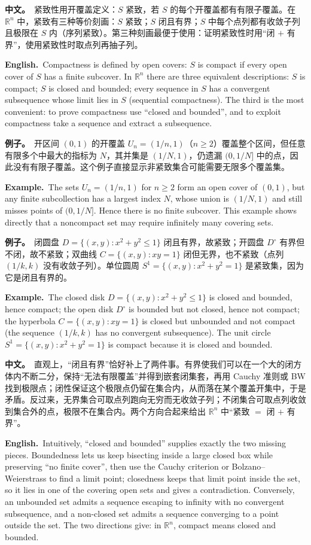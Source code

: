 \documentclass[UTF8,11pt,a4paper]{ctexart}
\newcommand{\BOTH}[2]{\par\noindent\textbf{中文。}\ #1\par\noindent\textbf{English.}\ #2\par}
\newcommand{\EX}[2]{\par\noindent\textbf{例子。}\ #1\par\noindent\textbf{Example.}\ #2\par}
\begin{document}
\BOTH{紧致性用开覆盖定义：$S$ 紧致，若 $S$ 的每个开覆盖都有有限子覆盖。在 $\mathbb R^n$ 中，紧致有三种等价刻画：$S$ 紧致；$S$ 闭且有界；$S$ 中每个点列都有收敛子列且极限在 $S$ 内（序列紧致）。第三种刻画最便于使用：证明紧致性时用“闭 $+$ 有界”，使用紧致性时取点列再抽子列。}{Compactness is defined by open covers: $S$ is compact if every open cover of $S$ has a finite subcover. In $\mathbb R^n$ there are three equivalent descriptions: $S$ is compact; $S$ is closed and bounded; every sequence in $S$ has a convergent subsequence whose limit lies in $S$ (sequential compactness). The third is the most convenient: to prove compactness use “closed and bounded”, and to exploit compactness take a sequence and extract a subsequence.}
\EX{开区间 $(0,1)$ 的开覆盖 $U_n=(1/n,1)$（$n\ge2$）覆盖整个区间，但任意有限多个中最大的指标为 $N$，其并集是 $(1/N,1)$，仍遗漏 $(0,1/N]$ 中的点，因此没有有限子覆盖。这个例子直接显示非紧致集合可能需要无限多个覆盖集。}{The sets $U_n=(1/n,1)$ for $n\ge2$ form an open cover of $(0,1)$, but any finite subcollection has a largest index $N$, whose union is $(1/N,1)$ and still misses points of $(0,1/N]$. Hence there is no finite subcover. This example shows directly that a noncompact set may require infinitely many covering sets.}
\EX{闭圆盘 $D=\{(x,y):x^2+y^2\le1\}$ 闭且有界，故紧致；开圆盘 $D^\circ$ 有界但不闭，故不紧致；双曲线 $C=\{(x,y):xy=1\}$ 闭但无界，也不紧致（点列 $(1/k,k)$ 没有收敛子列）。单位圆周 $S^1=\{(x,y):x^2+y^2=1\}$ 是紧致集，因为它是闭且有界的。}{The closed disk $D=\{(x,y):x^2+y^2\le1\}$ is closed and bounded, hence compact; the open disk $D^\circ$ is bounded but not closed, hence not compact; the hyperbola $C=\{(x,y):xy=1\}$ is closed but unbounded and not compact (the sequence $(1/k,k)$ has no convergent subsequence). The unit circle $S^1=\{(x,y):x^2+y^2=1\}$ is compact because it is closed and bounded.}
\BOTH{直观上，“闭且有界”恰好补上了两件事。有界使我们可以在一个大的闭方体内不断二分，保持“无法有限覆盖”并得到嵌套闭集套，再用 Cauchy 准则或 BW 找到极限点；闭性保证这个极限点仍留在集合内，从而落在某个覆盖开集中，于是矛盾。反过来，无界集合可取点列跑向无穷而无收敛子列；不闭集合可取点列收敛到集合外的点，极限不在集合内。两个方向合起来给出 $\mathbb R^n$ 中“紧致 $=$ 闭 $+$ 有界”。}{Intuitively, “closed and bounded” supplies exactly the two missing pieces. Boundedness lets us keep bisecting inside a large closed box while preserving “no finite cover”, then use the Cauchy criterion or Bolzano--Weierstrass to find a limit point; closedness keeps that limit point inside the set, so it lies in one of the covering open sets and gives a contradiction. Conversely, an unbounded set admits a sequence escaping to infinity with no convergent subsequence, and a non-closed set admits a sequence converging to a point outside the set. The two directions give: in $\mathbb R^n$, compact means closed and bounded.}
\end{document}
